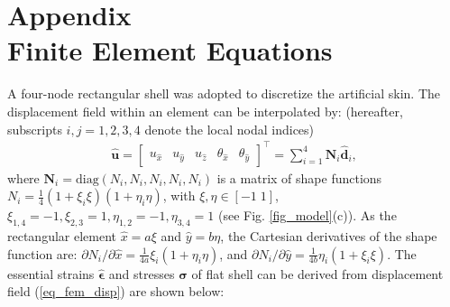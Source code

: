 \documentclass[10pt,letterpaper,journal,final,twoside,twocolumn,nofonttune]{IEEEtran}
\begin{document}
\section*{Appendix\\Finite Element Equations}
A four-node rectangular shell was adopted to discretize the artificial skin. The displacement field within an element can be interpolated by: (hereafter, subscripts $i,j=1,2,3,4$ denote the local nodal indices)
\begin{equation}
\label{eq_fem_disp}
\begin{aligned}
\hat{\mathbf{u}} =
\begin{bmatrix}
u_{\hat{x}}&
u_{\hat{y}}&u_{\hat{z}}&\theta_{\hat{x}}&\theta_{\hat{y}}
\end{bmatrix}^{\top}
=\sum\nolimits_{i=1}^{4}\mathbf{N}_i\hat{\mathbf{d}}_i,
\end{aligned}
\end{equation}
where $\mathbf{N}_i = \mathrm{diag}(N_i,N_i,N_i,N_i,N_i)$ is a matrix of shape functions $N_i = \frac{1}{4} (1+\xi_i\xi)(1+\eta_i\eta)$, with $\xi,\eta \in [-1 \;1]$, $\xi_{1,4} = -1,\xi_{2,3} = 1, \eta_{1,2} = -1, \eta_{3,4} = 1$ (see Fig. \ref{fig_model}(c)). 
As the rectangular element $\hat{x}=a\xi$ and $\hat{y}=b\eta$, the Cartesian derivatives of the shape function are: $\partial{N_i}/\partial{\hat{x}}=\frac{1}{4a} \xi_i(1+\eta_i\eta)$, and $\partial{N_i}/\partial{\hat{y}}=\frac{1}{4b} \eta_i(1+\xi_i\xi)$.
The essential strains $\hat{\bm{\epsilon}}$ and stresses $\hat{\bm{\sigma}}$ of flat shell \cite{Onate} can be derived from displacement field (\ref{eq_fem_disp}) are shown below:  
\end{document}
